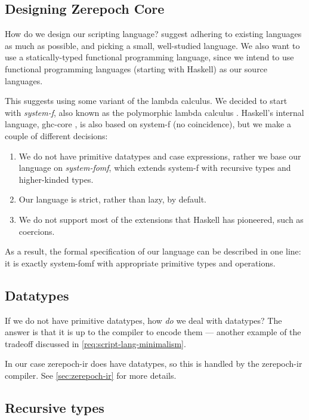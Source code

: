 \subsection{Designing Zerepoch Core}

How do we design our scripting language?
 suggest adhering to existing languages as much as possible, and picking a small, well-studied language.
We also want to use a statically-typed functional programming language, since we intend to use functional programming languages (starting with Haskell) as our source languages.

This suggests using some variant of the lambda calculus.
We decided to start with \emph{\gls{system-f}}, also known as the polymorphic lambda calculus \autocite{Girard-thesis}.
Haskell's internal language, \gls{ghc-core} \parencite{jones1998transformation}, is also based on \gls{system-f} (no coincidence), but we make a couple of different decisions:
\begin{enumerate}
  \item We do not have primitive datatypes and case expressions, rather we base our language on \emph{\gls{system-fomf}}, which extends \gls{system-f} with recursive types and higher-kinded types.
  \item Our language is strict, rather than lazy, by default.
  \item We do not support most of the extensions that Haskell has pioneered, such as coercions.
\end{enumerate}

As a result, the formal specification of our language can be described in one line: it is exactly \gls{system-fomf} with appropriate primitive types and operations.


\subsection{Datatypes}
If we do not have primitive datatypes, how \emph{do} we deal with datatypes?
The answer is that it is up to the compiler to encode them --- another example of the tradeoff discussed in \cref{req:script-lang-minimalism}.

In our case \gls{zerepoch-ir} does have datatypes, so this is handled by the \gls{zerepoch-ir} compiler. See \cref{sec:zerepoch-ir} for more details.

\subsection{Recursive types}

